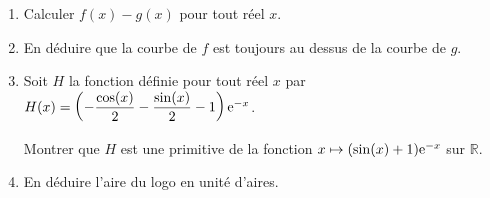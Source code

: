 \documentclass[11pt,fleqn, openany]{book} %
\begin{document}
\begin{exercise}[subtitle={(Guyane 2018)}]
\begin{center}
\begin{tikzpicture}[scale=0.9]
\end{tikzpicture}
\end{center}

\begin{enumerate}
\item Calculer $f(x)-g(x)$ pour tout réel $x$.
\item En déduire que la courbe de $f$ est toujours au dessus de la courbe de $g$.
\item Soit $H$ la fonction définie pour tout réel $x$ par  $H(x)=\left(-\dfrac{\cos(x)}{2}-\dfrac{ \sin(x)}{2}-1\right)\e^{-x}$. 

Montrer que $H$ est une primitive de la fonction  $x\mapsto (\sin(x)+1)\e^{-x}$ sur $\mathbb{R}$.
\item En déduire l'aire du logo en unité d'aires.
\end{enumerate}

\end{exercise}
\end{document}
